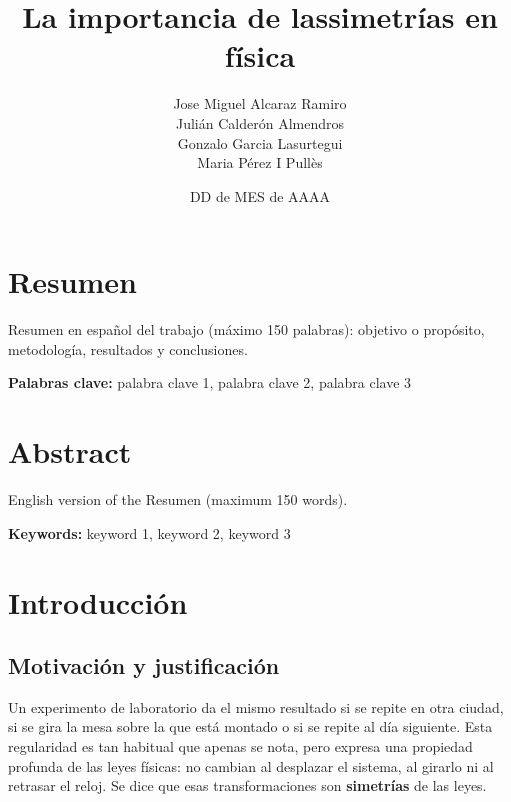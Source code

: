 \documentclass[11pt,a4paper,spanish]{book}
\title{La importancia de las\newline simetrías en física}
\author{\begin{tabular}[t]{@{}l@{}}Jose Miguel Alcaraz Ramiro\\ Julián
Calderón Almendros\\ Gonzalo Garcia Lasurtegui\\ Maria Pérez I
Pullès\end{tabular}}
\date{DD de MES de AAAA}
\begin{document}
\renewcommand{\listfigurename}{Índice de figuras}
\renewcommand{\listtablename}{Índice de tablas}
\renewcommand{\contentsname}{Índice de contenidos}
\renewcommand{\figurename}{Figura}
\renewcommand{\tablename}{Tabla}

\maketitle

\frontmatter
\tableofcontents
\listoftables

\chapter{Resumen}
Resumen en español del trabajo (máximo 150 palabras): objetivo o
propósito, metodología, resultados y conclusiones.

\vspace{\baselineskip}
{\bf Palabras clave:} palabra clave 1, palabra clave 2, palabra clave 3

\chapter{Abstract}
English version of the Resumen (maximum 150 words).

\vspace{\baselineskip}
{\bf Keywords:} keyword 1, keyword 2, keyword 3

\mainmatter
\newcommand{\bsS}{\boldsymbol{S}}
\newcommand{\bsL}{\boldsymbol{L}}
\newcommand{\bsH}{\boldsymbol{H}}
\newcommand{\bsT}{\boldsymbol{T}}
\newcommand{\bsdelta}{\boldsymbol{\delta}}

\chapter{Introducción}\label{introducciuxf3n}

\section{Motivación y
justificación}\label{motivaciuxf3n-y-justificaciuxf3n}

Un experimento de laboratorio da el mismo resultado si se repite en otra
ciudad, si se gira la mesa sobre la que está montado o si se repite al
día siguiente. Esta regularidad es tan habitual que apenas se nota, pero
expresa una propiedad profunda de las leyes físicas: no cambian al
desplazar el sistema, al girarlo ni al retrasar el reloj. Se dice que
esas transformaciones son \textbf{simetrías} de las leyes.
\end{document}
